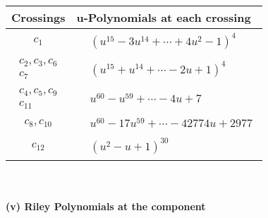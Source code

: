 \documentclass[1p]{elsarticle_modified}
\theoremstyle{definition}
\begin{document}
\begin{tabular}{m{50pt}|m{274pt}}
Crossings & \hspace{64pt}u-Polynomials at each crossing \\
\hline $$\begin{aligned}c_{1}\end{aligned}$$&$\begin{aligned}
&(u^{15}-3 u^{14}+\cdots+4 u^2-1)^{4}
\end{aligned}$\\
\hline $$\begin{aligned}c_{2},c_{3},c_{6}\\c_{7}\end{aligned}$$&$\begin{aligned}
&(u^{15}+u^{14}+\cdots-2 u+1)^{4}
\end{aligned}$\\
\hline $$\begin{aligned}c_{4},c_{5},c_{9}\\c_{11}\end{aligned}$$&$\begin{aligned}
&u^{60}- u^{59}+\cdots-4 u+7
\end{aligned}$\\
\hline $$\begin{aligned}c_{8},c_{10}\end{aligned}$$&$\begin{aligned}
&u^{60}-17 u^{59}+\cdots-42774 u+2977
\end{aligned}$\\
\hline $$\begin{aligned}c_{12}\end{aligned}$$&$\begin{aligned}
&(u^2- u+1)^{30}
\end{aligned}$\\
\hline
\end{tabular}\\~\\
\newpage\renewcommand{\arraystretch}{1}
\flushleft \textbf{(v) Riley Polynomials at the component}\newline \\
\end{document}
